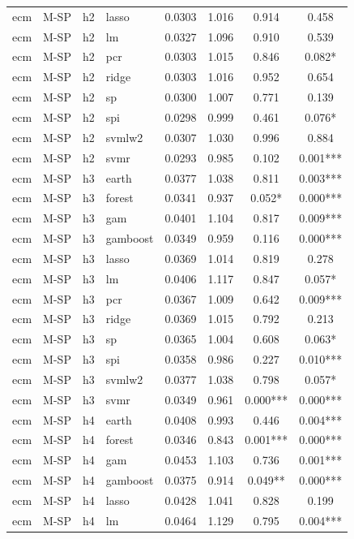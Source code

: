 \begin{ThreePartTable}
\begin{longtable}[t]{llclcccc}
ecm & M-SP & h2 & lasso & 0.0303 & 1.016 & 0.914 & 0.458\\
ecm & M-SP & h2 & lm & 0.0327 & 1.096 & 0.910 & 0.539\\
ecm & M-SP & h2 & pcr & 0.0303 & 1.015 & 0.846 & 0.082*\\
ecm & M-SP & h2 & ridge & 0.0303 & 1.016 & 0.952 & 0.654\\
ecm & M-SP & h2 & sp & 0.0300 & 1.007 & 0.771 & 0.139\\
ecm & M-SP & h2 & spi & 0.0298 & 0.999 & 0.461 & 0.076*\\
ecm & M-SP & h2 & svmlw2 & 0.0307 & 1.030 & 0.996 & 0.884\\
ecm & M-SP & h2 & svmr & 0.0293 & 0.985 & 0.102 & 0.001***\\
\addlinespace
ecm & M-SP & h3 & earth & 0.0377 & 1.038 & 0.811 & 0.003***\\
ecm & M-SP & h3 & forest & 0.0341 & 0.937 & 0.052* & 0.000***\\
ecm & M-SP & h3 & gam & 0.0401 & 1.104 & 0.817 & 0.009***\\
ecm & M-SP & h3 & gamboost & 0.0349 & 0.959 & 0.116 & 0.000***\\
ecm & M-SP & h3 & lasso & 0.0369 & 1.014 & 0.819 & 0.278\\
ecm & M-SP & h3 & lm & 0.0406 & 1.117 & 0.847 & 0.057*\\
ecm & M-SP & h3 & pcr & 0.0367 & 1.009 & 0.642 & 0.009***\\
ecm & M-SP & h3 & ridge & 0.0369 & 1.015 & 0.792 & 0.213\\
ecm & M-SP & h3 & sp & 0.0365 & 1.004 & 0.608 & 0.063*\\
ecm & M-SP & h3 & spi & 0.0358 & 0.986 & 0.227 & 0.010***\\
ecm & M-SP & h3 & svmlw2 & 0.0377 & 1.038 & 0.798 & 0.057*\\
ecm & M-SP & h3 & svmr & 0.0349 & 0.961 & 0.000*** & 0.000***\\
\addlinespace
ecm & M-SP & h4 & earth & 0.0408 & 0.993 & 0.446 & 0.004***\\
ecm & M-SP & h4 & forest & 0.0346 & 0.843 & 0.001*** & 0.000***\\
ecm & M-SP & h4 & gam & 0.0453 & 1.103 & 0.736 & 0.001***\\
ecm & M-SP & h4 & gamboost & 0.0375 & 0.914 & 0.049** & 0.000***\\
ecm & M-SP & h4 & lasso & 0.0428 & 1.041 & 0.828 & 0.199\\
ecm & M-SP & h4 & lm & 0.0464 & 1.129 & 0.795 & 0.004***\\

\end{longtable}
\end{ThreePartTable}
